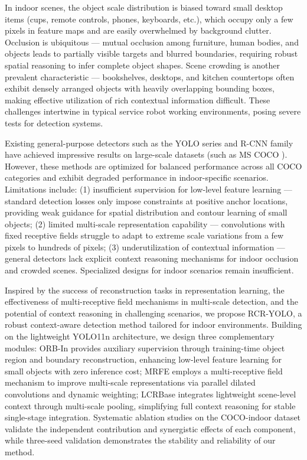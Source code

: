 \documentclass[journal]{IEEEtran}
\begin{document}
In indoor scenes, the object scale distribution is biased toward small desktop items (cups, remote controls, phones, keyboards, etc.), which occupy only a few pixels in feature maps and are easily overwhelmed by background clutter. Occlusion is ubiquitous — mutual occlusion among furniture, human bodies, and objects leads to partially visible targets and blurred boundaries, requiring robust spatial reasoning to infer complete object shapes. Scene crowding is another prevalent characteristic — bookshelves, desktops, and kitchen countertops often exhibit densely arranged objects with heavily overlapping bounding boxes, making effective utilization of rich contextual information difficult. These challenges intertwine in typical service robot working environments, posing severe tests for detection systems.

Existing general-purpose detectors such as the YOLO series \cite{redmon2016yolo,bochkovskiy2020yolov4,ultralytics2023yolov8} and R-CNN family \cite{girshick2014rcnn,ren2015faster} have achieved impressive results on large-scale datasets (such as MS COCO \cite{lin2014microsoft}). However, these methods are optimized for balanced performance across all COCO categories and exhibit degraded performance in indoor-specific scenarios. Limitations include: (1) insufficient supervision for low-level feature learning — standard detection losses only impose constraints at positive anchor locations, providing weak guidance for spatial distribution and contour learning of small objects; (2) limited multi-scale representation capability — convolutions with fixed receptive fields struggle to adapt to extreme scale variations from a few pixels to hundreds of pixels; (3) underutilization of contextual information — general detectors lack explicit context reasoning mechanisms for indoor occlusion and crowded scenes. Specialized designs for indoor scenarios remain insufficient.

Inspired by the success of reconstruction tasks in representation learning, the effectiveness of multi-receptive field mechanisms in multi-scale detection, and the potential of context reasoning in challenging scenarios, we propose RCR-YOLO, a robust context-aware detection method tailored for indoor environments. Building on the lightweight YOLO11n architecture, we design three complementary modules: ORB-In provides auxiliary supervision through training-time object region and boundary reconstruction, enhancing low-level feature learning for small objects with zero inference cost; MRFE employs a multi-receptive field mechanism to improve multi-scale representations via parallel dilated convolutions and dynamic weighting; LCRBase integrates lightweight scene-level context through multi-scale pooling, simplifying full context reasoning for stable single-stage integration. Systematic ablation studies on the COCO-indoor dataset validate the independent contribution and synergistic effects of each component, while three-seed validation demonstrates the stability and reliability of our method.
\end{document}
